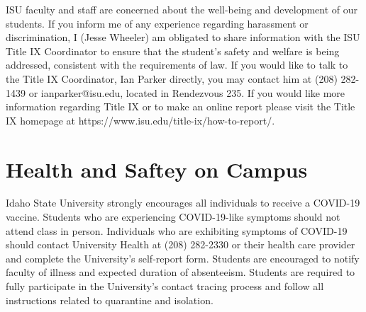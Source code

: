 \documentclass[11pt]{article}\usepackage[]{graphicx}\usepackage[]{xcolor}
\begin{document}
ISU faculty and staff are concerned about the well-being and development of our students. 
If you inform me of any experience regarding harassment or discrimination, I (Jesse Wheeler) am obligated to share information with the ISU Title IX Coordinator to ensure that the student’s safety and welfare is being addressed, consistent with the requirements of law.
If you would like to talk to the Title IX Coordinator, Ian Parker directly, you may contact him at (208) 282-1439 or ianparker@isu.edu, located in Rendezvous 235.
If you would like more information regarding Title IX or to make an online report please visit the Title IX homepage at https://www.isu.edu/title-ix/how-to-report/.

\section{Health and Saftey on Campus}

Idaho State University strongly encourages all individuals to receive a COVID-19 vaccine.
Students who are experiencing COVID-19-like symptoms should not attend class in person.
Individuals who are exhibiting symptoms of COVID-19 should contact University Health at (208) 282-2330 or their health care provider and complete the University’s self-report form.
Students are encouraged to notify faculty of illness and expected duration of absenteeism.
Students are required to fully participate in the University’s contact tracing process and follow all instructions related to quarantine and isolation.
\end{document}
